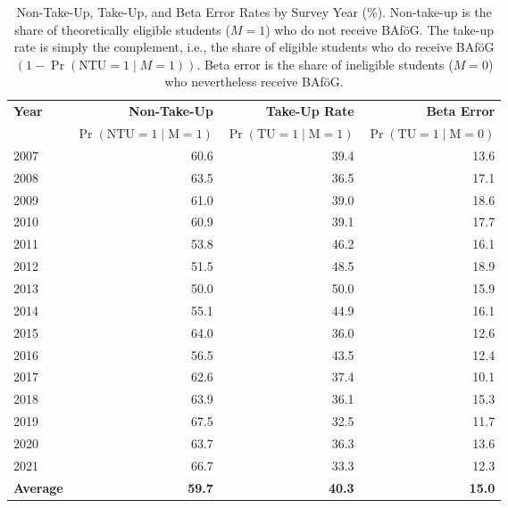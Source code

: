 \begin{table}[htbp]
\small
\centering
\begin{tabular}{l@{\hspace{2em}}r@{\hspace{2em}}r@{\hspace{2em}}r}
\toprule
\textbf{Year} & \textbf{Non-Take-Up} & \textbf{Take-Up Rate} & \textbf{Beta Error} \\
              & \(\Pr(\text{NTU} = 1 \mid \text{M} = 1)\) & \(\Pr(\text{TU} = 1 \mid \text{M} = 1)\) & \(\Pr(\text{TU} = 1 \mid \text{M} = 0)\) \\
\midrule
2007 & 60.6 & 39.4 & 13.6 \\
2008 & 63.5 & 36.5 & 17.1 \\
2009 & 61.0 & 39.0 & 18.6 \\
2010 & 60.9 & 39.1 & 17.7 \\
2011 & 53.8 & 46.2 & 16.1 \\
2012 & 51.5 & 48.5 & 18.9 \\
2013 & 50.0 & 50.0 & 15.9 \\
2014 & 55.1 & 44.9 & 16.1 \\
2015 & 64.0 & 36.0 & 12.6 \\
2016 & 56.5 & 43.5 & 12.4 \\
2017 & 62.6 & 37.4 & 10.1 \\
2018 & 63.9 & 36.1 & 15.3 \\
2019 & 67.5 & 32.5 & 11.7 \\
2020 & 63.7 & 36.3 & 13.6 \\
2021 & 66.7 & 33.3 & 12.3 \\
\midrule
\textbf{Average} & \textbf{59.7} & \textbf{40.3} & \textbf{15.0} \\
\bottomrule
\end{tabular}
\caption{\small{Non-Take-Up, Take-Up, and Beta Error Rates by Survey Year (\%). Non-take-up is the share of theoretically eligible students (\(M=1\)) who do not receive BAföG. The take-up rate is simply the complement, i.e., the share of eligible students who do receive BAföG \((1 - \Pr(\text{NTU} = 1 \mid M = 1))\). Beta error is the share of ineligible students (\(M=0\)) who nevertheless receive BAföG.}}
\label{table:microsimulation_ntu_updated}
\end{table}
